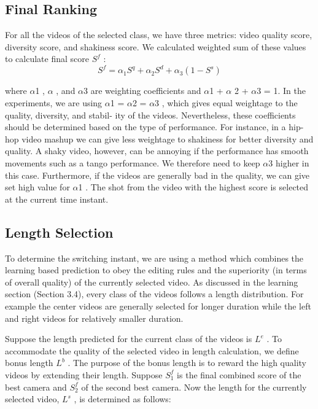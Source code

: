 \documentclass{new}
\begin{document}
\subsection{Final Ranking}


For all the videos of the selected class, we have three metrics:
video quality score, diversity score, and shakiness score. We calculated weighted sum of these values to calculate final score $S^f$ :
\begin{equation}
    S^f = \alpha_1S^q + \alpha_2S^d + \alpha_3(1 - S^s)
\end{equation}

where $\alpha$1 , $\alpha $ , and $\alpha$3 are weighting coefficients and $\alpha$1 + $\alpha$ 2 +
$\alpha$3 = 1. In the experiments, we are using $\alpha$1 = $\alpha$2 = $\alpha$3 , which gives equal weightage to the quality, diversity, and stabil-
ity of the videos. Nevertheless, these coefficients should be determined based on the type of performance. For instance, in a hip-hop
video mashup we can give less weightage to shakiness for better diversity and quality. A shaky video, however, can be annoying if the
performance has smooth movements such as a tango performance.
We therefore need to keep $\alpha$3 higher in this case. Furthermore, if
the videos are generally bad in the quality, we can give set high
value for $\alpha$1 . The shot from the video with the highest score is
selected at the current time instant.

\subsection{Length Selection}
To determine the switching instant, we are using a method which
combines the learning based prediction to obey the editing rules and
the superiority (in terms of overall quality) of the currently selected
video. As discussed in the learning section (Section 3.4), every
class of the videos follows a length distribution. For example the
center videos are generally selected for longer duration while the
left and right videos for relatively smaller duration.

Suppose the length predicted for the current class of the videos
is $L^e$ . To accommodate the quality of the selected video in length
calculation, we define bonus length $L^b$ . The purpose of the bonus
length is to reward the high quality videos by extending their length.
Suppose $S_1^f$ is the final combined score of the best camera and $S_2^f$
of the second best camera. Now the length for the currently selected
video, $L^s$ , is determined as follows:
\end{document}

